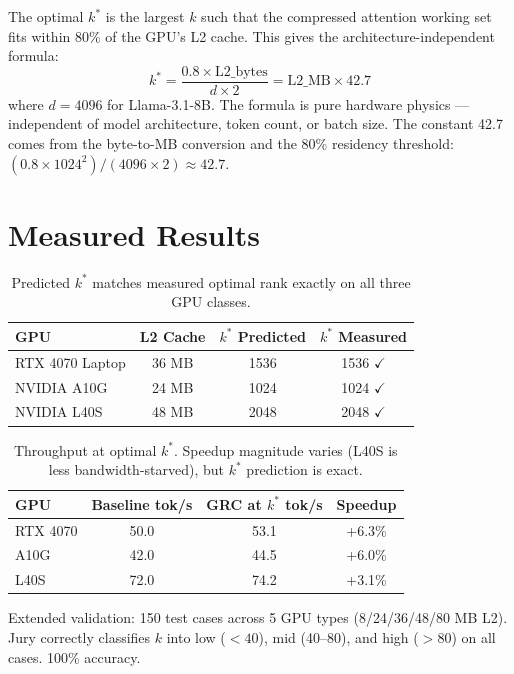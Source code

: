\documentclass[11pt]{article}
\begin{document}
The optimal $k^*$ is the largest $k$ such that the compressed attention
working set fits within 80\% of the GPU's L2 cache. This gives the
architecture-independent formula:
\begin{equation}
k^* = \frac{0.8 \times \mathrm{L2\_bytes}}{d \times 2}
    = \mathrm{L2\_MB} \times 42.7
\end{equation}
where $d{=}4096$ for Llama-3.1-8B. The formula is pure hardware physics ---
independent of model architecture, token count, or batch size. The
constant 42.7 comes from the byte-to-MB conversion and the 80\% residency
threshold: $(0.8 \times 1024^2) / (4096 \times 2) \approx 42.7$.

\section{Measured Results}

\begin{table}[h]\centering
\begin{tabular}{lccc}\toprule
GPU & L2 Cache & $k^*$ Predicted & $k^*$ Measured \\\midrule
RTX 4070 Laptop & 36 MB & 1536 & 1536 $\checkmark$ \\
NVIDIA A10G & 24 MB & 1024 & 1024 $\checkmark$ \\
NVIDIA L40S & 48 MB & 2048 & 2048 $\checkmark$ \\\bottomrule
\end{tabular}
\caption{Predicted $k^*$ matches measured optimal rank exactly on all
three GPU classes.}
\end{table}

\begin{table}[h]\centering
\begin{tabular}{lccc}\toprule
GPU & Baseline tok/s & GRC at $k^*$ tok/s & Speedup \\\midrule
RTX 4070 & 50.0 & 53.1 & +6.3\% \\
A10G & 42.0 & 44.5 & +6.0\% \\
L40S & 72.0 & 74.2 & +3.1\% \\\bottomrule
\end{tabular}
\caption{Throughput at optimal $k^*$. Speedup magnitude varies (L40S is
less bandwidth-starved), but $k^*$ prediction is exact.}
\end{table}

Extended validation: 150 test cases across 5 GPU types (8/24/36/48/80 MB
L2). Jury correctly classifies $k$ into low ($<40$), mid (40--80), and
high ($>80$) on all cases. 100\% accuracy.
\end{document}
